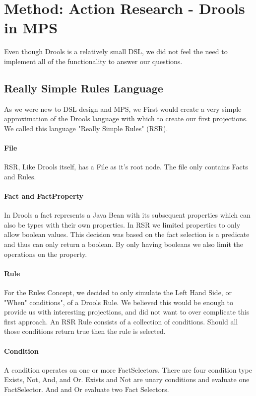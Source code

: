 \section{Method: Action Research - Drools in MPS}\label{section:Method_action_research}

Even though Drools is a relatively small DSL, we did not feel the need to implement all of the functionality to answer our questions.

\subsection{Really Simple Rules Language}
As we were new to DSL design and MPS, we First would create a very simple approximation of the Drools language with which to create our first projections.
We called this language "Really Simple Rules" (RSR).

\paragraph{File} RSR, Like Drools itself, has a File as it's root node.
The file only contains Facts and Rules.

\paragraph{Fact and FactProperty} In Drools a fact represents a Java Bean with its subsequent properties which can also be types with their own properties.
In RSR we limited properties to only allow boolean values.
This decision was based on the fact selection is a predicate and thus can only return a boolean.
By only having booleans we also limit the operations on the property.

\paragraph{Rule} For the Rules Concept, we decided to only simulate the Left Hand Side, or "When" conditions", of a Drools Rule.
We believed this would be enough to provide us with interesting projections, and did not want to over complicate this first approach.
An RSR Rule consists of a collection of conditions.
Should all those conditions return true then the rule is selected.

\paragraph{Condition} A condition operates on one or more FactSelectors.
There are four condition type Exists, Not, And, and Or.
Exists and Not are unary conditions and evaluate one FactSelector.
And and Or evaluate two Fact Selectors.

